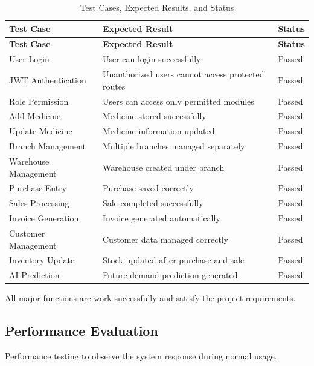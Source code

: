 \begin{longtable}{|p{4.3cm}|p{8.2cm}|p{2cm}|}
\caption{Test Cases, Expected Results, and Status} \\
\hline
\textbf{Test Case} & \textbf{Expected Result} & \textbf{Status} \\
\hline
\endfirsthead

\hline
\textbf{Test Case} & \textbf{Expected Result} & \textbf{Status} \\
\hline
\endhead

\hline
\endfoot

\hline
\endlastfoot

User Login & User can login successfully & Passed \\
\hline
JWT Authentication & Unauthorized users cannot access protected routes & Passed \\
\hline
Role Permission & Users can access only permitted modules & Passed \\
\hline
Add Medicine & Medicine stored successfully & Passed \\
\hline
Update Medicine & Medicine information updated & Passed \\
\hline
Branch Management & Multiple branches managed separately & Passed \\
\hline
Warehouse Management & Warehouse created under branch & Passed \\
\hline
Purchase Entry & Purchase saved correctly & Passed \\
\hline
Sales Processing & Sale completed successfully & Passed \\
\hline
Invoice Generation & Invoice generated automatically & Passed \\
\hline
Customer Management & Customer data managed correctly & Passed \\
\hline
Inventory Update & Stock updated after purchase and sale & Passed \\
\hline
AI Prediction & Future demand prediction generated & Passed \\
\hline

\end{longtable}

All major functions are work successfully and satisfy the project requirements.

\subsection{Performance Evaluation}
Performance testing to observe the system response during normal usage.

